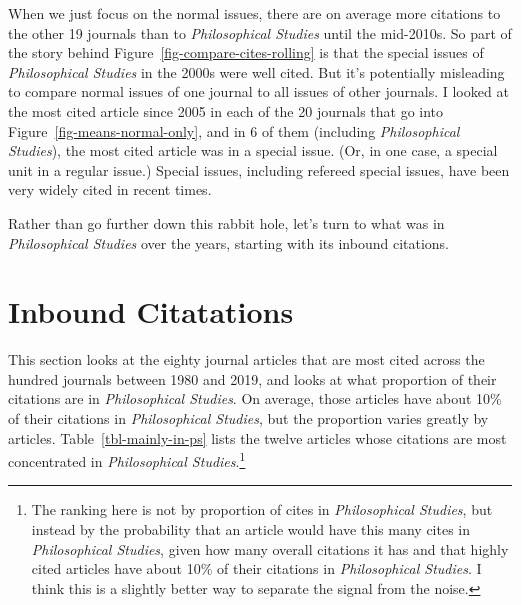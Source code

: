 \documentclass[
  10pt,
  letterpaper,
  DIV=11,
  numbers=noendperiod,
  twoside]{scrartcl}
\begin{document}
When we just focus on the normal issues, there are on average more
citations to the other 19 journals than to \emph{Philosophical Studies}
until the mid-2010s. So part of the story behind
Figure~\ref{fig-compare-cites-rolling} is that the special issues of
\emph{Philosophical Studies} in the 2000s were well cited. But it's
potentially misleading to compare normal issues of one journal to all
issues of other journals. I looked at the most cited article since 2005
in each of the 20 journals that go into
Figure~\ref{fig-means-normal-only}, and in 6 of them (including
\emph{Philosophical Studies}), the most cited article was in a special
issue. (Or, in one case, a special unit in a regular issue.) Special
issues, including refereed special issues, have been very widely cited
in recent times.

Rather than go further down this rabbit hole, let's turn to what was in
\emph{Philosophical Studies} over the years, starting with its inbound
citations.

\section{Inbound Citatations}\label{sec-inbound-citations}

This section looks at the eighty journal articles that are most cited
across the hundred journals between 1980 and 2019, and looks at what
proportion of their citations are in \emph{Philosophical Studies}. On
average, those articles have about 10\% of their citations in
\emph{Philosophical Studies}, but the proportion varies greatly by
articles. Table~\ref{tbl-mainly-in-ps} lists the twelve articles whose
citations are most concentrated in \emph{Philosophical
Studies}.\footnote{The ranking here is not by proportion of cites in
  \emph{Philosophical Studies}, but instead by the probability that an
  article would have this many cites in \emph{Philosophical Studies},
  given how many overall citations it has and that highly cited articles
  have about 10\% of their citations in \emph{Philosophical Studies}. I
  think this is a slightly better way to separate the signal from the
  noise.}
\end{document}
